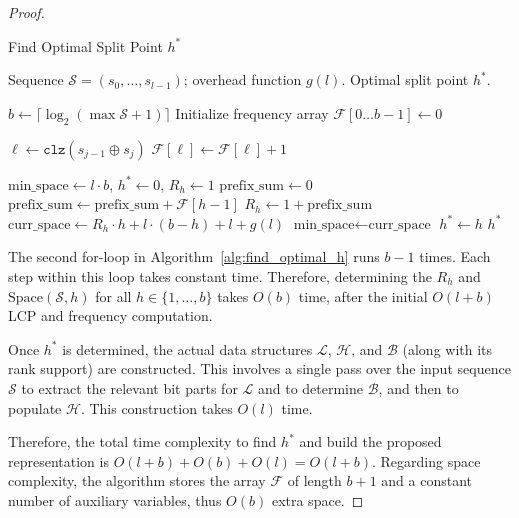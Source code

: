 \begin{proof}
\begin{algorithm}[H] %
\caption{Find Optimal Split Point $h^*$}
\label{alg:find_optimal_h}
\begin{algorithmic}[1]
\Require Sequence \(\mathcal{S} = (s_0, \dots, s_{l-1})\); overhead function \(g(l)\).
\Ensure Optimal split point \(h^*\).

\State \( b \gets \lceil \log_2 (\max \mathcal S + 1) \rceil \)
\State Initialize frequency array \(\mathcal{F}[0 \dots b-1] \gets 0\)

        \State \(\ell \gets \texttt{clz}(s_{j-1} \oplus s_j)\)
        \State \(\mathcal{F}[\ell] \gets \mathcal{F}[\ell] + 1\)
    \EndIf
\EndFor

\State \(\text{min\_space} \gets l \cdot b\), \quad \(h^* \gets 0\), \quad \(R_h \gets 1\)
\State \(\text{prefix\_sum} \gets 0\)
    \State \(\text{prefix\_sum} \gets \text{prefix\_sum} + \mathcal{F}[h - 1] \)
    \State \(R_h \gets 1 + \text{prefix\_sum}\)
    \State \(\text{curr\_space} \gets R_h \cdot h + l \cdot (b - h) + l + g(l)\)
        \State \(\text{min\_space} \gets \text{curr\_space}\)
        \State \(h^* \gets h\)
    \EndIf
\EndFor
\State \Return \(h^*\)
\end{algorithmic}
\end{algorithm}

The second for-loop in Algorithm~\ref{alg:find_optimal_h} runs $b-1$ times. Each step within this loop takes constant time. Therefore, determining the $R_h$ and $\mathrm{Space}(\mathcal{S}, h)$ for all $h \in \{1, \dots, b\}$ takes $O(b)$ time, after the initial $O(l+b)$ LCP and frequency computation.

Once $h^*$ is determined, the actual data structures $\mathcal{L}$, $\mathcal{H}$, and $\mathcal{B}$ (along with its rank support) are constructed. This involves a single pass over the input sequence $\mathcal{S}$ to extract the relevant bit parts for $\mathcal{L}$ and to determine $\mathcal{B}$, and then to populate $\mathcal{H}$. This construction takes $O(l)$ time.

Therefore, the total time complexity to find $h^*$ and build the proposed representation is $O(l+b) + O(b) +  O(l) = O(l+b)$. Regarding space complexity, the algorithm stores the array \(\mathcal F\) of length \(b + 1\) and a constant number of auxiliary variables, thus $O(b)$ extra space.
\end{proof}



